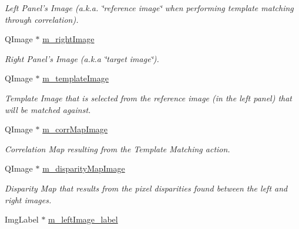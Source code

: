 \begin{CompactItemize}
\begin{CompactList}\small\item\em Left Panel's Image (a.k.a. \char`\"{}reference image\char`\"{} when performing template matching through correlation). \item\end{CompactList}\item 
\hypertarget{classQcorr_ae1695d731f191c694186e00b96f469e}{
QImage $\ast$ \hyperlink{classQcorr_ae1695d731f191c694186e00b96f469e}{m\_\-rightImage}}
\label{classQcorr_ae1695d731f191c694186e00b96f469e}

\begin{CompactList}\small\item\em Right Panel's Image (a.k.a \char`\"{}target image\char`\"{}). \item\end{CompactList}\item 
\hypertarget{classQcorr_5594d939890f10991da0009e4c32bea3}{
QImage $\ast$ \hyperlink{classQcorr_5594d939890f10991da0009e4c32bea3}{m\_\-templateImage}}
\label{classQcorr_5594d939890f10991da0009e4c32bea3}

\begin{CompactList}\small\item\em Template Image that is selected from the reference image (in the left panel) that will be matched against. \item\end{CompactList}\item 
\hypertarget{classQcorr_c7dc2785613864bea2d8bb0b5f009f36}{
QImage $\ast$ \hyperlink{classQcorr_c7dc2785613864bea2d8bb0b5f009f36}{m\_\-corrMapImage}}
\label{classQcorr_c7dc2785613864bea2d8bb0b5f009f36}

\begin{CompactList}\small\item\em Correlation Map resulting from the Template Matching action. \item\end{CompactList}\item 
\hypertarget{classQcorr_731915641051962d6a03a31b772640d4}{
QImage $\ast$ \hyperlink{classQcorr_731915641051962d6a03a31b772640d4}{m\_\-disparityMapImage}}
\label{classQcorr_731915641051962d6a03a31b772640d4}

\begin{CompactList}\small\item\em Disparity Map that results from the pixel disparities found between the left and right images. \item\end{CompactList}\item 
\hypertarget{classQcorr_cadb3032fbf41f8f1b27067c2784efef}{
ImgLabel $\ast$ \hyperlink{classQcorr_cadb3032fbf41f8f1b27067c2784efef}{m\_\-leftImage\_\-label}}
\label{classQcorr_cadb3032fbf41f8f1b27067c2784efef}


\end{CompactItemize}

